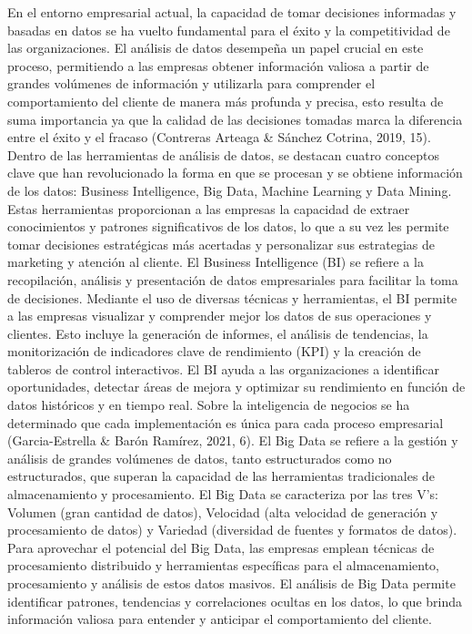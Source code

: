 En el entorno empresarial actual, la capacidad de tomar decisiones informadas y basadas en datos se ha vuelto fundamental para el éxito y la competitividad de las organizaciones. El análisis de datos desempeña un papel crucial en este proceso, permitiendo a las empresas obtener información valiosa a partir de grandes volúmenes de información y utilizarla para comprender el comportamiento del cliente de manera más profunda y precisa, esto resulta de suma importancia ya que la calidad de las decisiones tomadas marca la diferencia entre el éxito y el fracaso (Contreras Arteaga & Sánchez Cotrina, 2019, 15). 
Dentro de las herramientas de análisis de datos, se destacan cuatro conceptos clave que han revolucionado la forma en que se procesan y se obtiene información de los datos: Business Intelligence, Big Data, Machine Learning y Data Mining. Estas herramientas proporcionan a las empresas la capacidad de extraer conocimientos y patrones significativos de los datos, lo que a su vez les permite tomar decisiones estratégicas más acertadas y personalizar sus estrategias de marketing y atención al cliente. 
El Business Intelligence (BI) se refiere a la recopilación, análisis y presentación de datos empresariales para facilitar la toma de decisiones. Mediante el uso de diversas técnicas y herramientas, el BI permite a las empresas visualizar y comprender mejor los datos de sus operaciones y clientes. Esto incluye la generación de informes, el análisis de tendencias, la monitorización de indicadores clave de rendimiento (KPI) y la creación de tableros de control interactivos. El BI ayuda a las organizaciones a identificar oportunidades, detectar áreas de mejora y optimizar su rendimiento en función de datos históricos y en tiempo real. Sobre la inteligencia de negocios se ha determinado que cada implementación es única para cada proceso empresarial (Garcia-Estrella & Barón Ramírez, 2021, 6). 
El Big Data se refiere a la gestión y análisis de grandes volúmenes de datos, tanto estructurados como no estructurados, que superan la capacidad de las herramientas tradicionales de almacenamiento y procesamiento. El Big Data se caracteriza por las tres V's: Volumen (gran cantidad de datos), Velocidad (alta velocidad de generación y procesamiento de datos) y Variedad (diversidad de fuentes y formatos de datos). Para aprovechar el potencial del Big Data, las empresas emplean técnicas de procesamiento distribuido y herramientas específicas para el almacenamiento, procesamiento y análisis de estos datos masivos. El análisis de Big Data permite identificar patrones, tendencias y correlaciones ocultas en los datos, lo que brinda información valiosa para entender y anticipar el comportamiento del cliente. 
